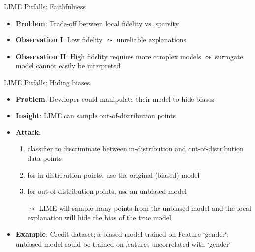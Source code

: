\documentclass[11pt,compress,t,notes=noshow, aspectratio=169, xcolor=table]{beamer}
\begin{document}
\begin{vbframe}[c]{LIME Pitfalls: Faithfulness}
\begin{itemize}
\itemsep1em
	\item \textbf{Problem}: Trade-off between local fidelity vs. sparsity
	\item \textbf{Observation I}: Low fidelity $\leadsto$ unreliable explanations
	\item \textbf{Observation II}: High fidelity requires more complex models $\leadsto$ surrogate model cannot easily be interpreted
\end{itemize}

\end{vbframe}

\begin{vbframe}{LIME Pitfalls: Hiding biases }

\begin{itemize}
	\item \textbf{Problem}: Developer could manipulate their model to hide biases 
	\item \textbf{Insight}: LIME can sample out-of-distribution points
	\item \textbf{Attack}:
	\begin{enumerate}
	    \item classifier to discriminate between in-distribution and out-of-distribution data points
	    \item for in-distribution points, use the original (biased) model
	    \item for out-of-distribution points, use an unbiased model 
	    \item[$\leadsto$] LIME will sample many points from the unbiased model and the local explanation will hide the bias of the true model
	\end{enumerate}
	\item \textbf{Example}: Credit dataset; a biased model trained on Feature `gender`; unbiased model could be trained on features uncorrelated with `gender`
\end{itemize}
\end{vbframe}
\end{document}
